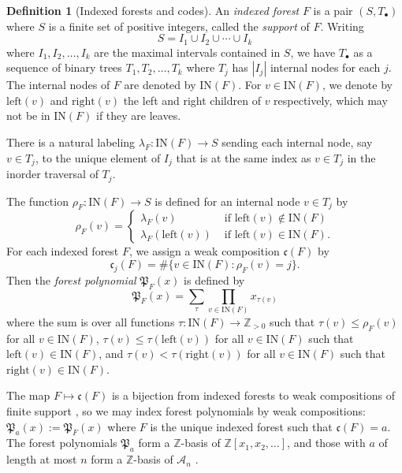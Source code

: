 \documentclass{amsart}
\theoremstyle{definition}
\newtheorem{definition}[lemma]{Definition}
\theoremstyle{remark}
\numberwithin{equation}{subsection}
\newcommand{\coma}{\mathcal{A}}
\newcommand{\code}{\mathfrak{c}}
\newcommand{\forest}{\mathfrak{P}}
\begin{document}
\begin{definition}[Indexed forests and codes]
  An \emph{indexed forest} $F$ is a pair $(S, T_\bullet)$ where $S$ is a finite set of positive integers, called the \emph{support} of $F$. Writing
  $$S=I_1\cup I_2\cup \cdots \cup I_k$$
  where $I_1,I_2,\ldots, I_k$ are the maximal intervals contained in $S$, we have $T_\bullet$ as a sequence of binary trees $T_1,T_2,\ldots, T_k$ where $T_j$ has $|I_j|$ internal nodes for each $j$. The internal nodes of $F$ are denoted by $\mathrm{IN}(F)$. For $v\in \mathrm{IN}(F)$, we denote by $\mathrm{left}(v)$ and $\mathrm{right}(v)$ the left and right children of $v$ respectively, which may not be in $\mathrm{IN}(F)$ if they are leaves.
  
  There is a natural labeling $\lambda_F:\mathrm{IN}(F)\to S$ sending each internal node, say $v\in T_j$, to the unique element of $I_j$ that is at the same index as $v\in T_j$ in the inorder traversal of $T_j$.
  
  The function $\rho_F:\mathrm{IN}(F)\to S$ is defined for an internal node $v\in T_j$ by 
  $$\rho_F(v) = \begin{cases}
  \lambda_F(v)&\mbox{ if }\mathrm{left}(v)\notin\mathrm{IN}(F)\\
  \lambda_F(\mathrm{left}(v))&\mbox{ if }\mathrm{left}(v)\in\mathrm{IN}(F).
  \end{cases}$$
  For each indexed forest $F$, we assign a weak composition $\code(F)$ by
  $$\code_j(F)=\#\{v\in \mathrm{IN}(F): \rho_F(v)=j\}.$$
  Then the \emph{forest polynomial} $\forest_F(x)$ is defined by
  $$\forest_F(x) = \sum_{\tau}\prod_{v\in\mathrm{IN}(F)}x_{\tau(v)}$$
  where the sum is over all functions $\tau:\mathrm{IN}(F)\to \mathbb{Z}_{>0}$ such that $\tau(v)\leq \rho_F(v)$ for all $v\in \mathrm{IN}(F)$, $\tau(v)\leq\tau(\mathrm{left}(v))$ for all $v\in \mathrm{IN}(F)$ such that $\mathrm{left}(v)\in \mathrm{IN}(F)$, and $\tau(v)<\tau(\mathrm{right}(v))$ for all $v\in \mathrm{IN}(F)$ such that $\mathrm{right}(v)\in \mathrm{IN}(F)$.

  The map $F\mapsto\code(F)$ is a bijection from indexed forests to weak compositions of finite support \cite{nadeau2024forest}, so we may index forest polynomials by weak compositions: $\forest_a(x) := \forest_F(x)$ where $F$ is the unique indexed forest such that $\code(F) = a$. The forest polynomials $\forest_a$ form a $\mathbb{Z}$-basis of $\mathbb{Z}[x_1,x_2,\ldots]$, and those with $a$ of length at most $n$ form a $\mathbb{Z}$-basis of $\coma_n$ \cite{nadeau2024forest}.
\end{definition}
\end{document}
